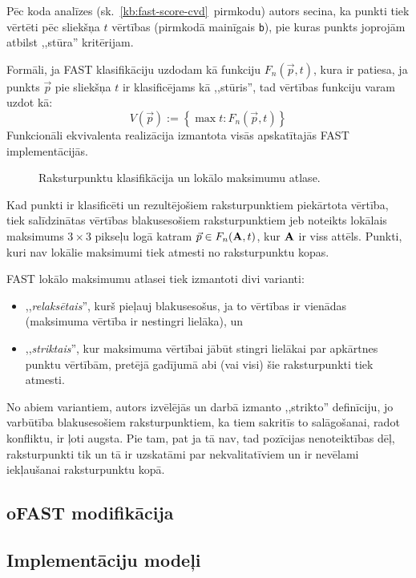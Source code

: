 Pēc koda analīzes (sk.~\ref{kb:fast-score-cvd}~pirmkodu)
autors secina, ka punkti tiek vērtēti pēc sliekšņa $t$ vērtības
(pirmkodā mainīgais \texttt{b}), pie kuras
punkts joprojām atbilst ,,stūra'' kritērijam.

Formāli, ja FAST klasifikāciju uzdodam kā funkciju $F_n(\vec{p}, t)$,
kura ir patiesa, ja punkts $\vec{p}$ pie sliekšņa $t$ ir klasificējams
kā ,,stūris'', tad vērtības funkciju varam uzdot kā:
\begin{equation}
	V(\vec{p}) := \left\{ \max{t} : F_n(\vec{p}, t) \right\}
\end{equation}
Funkcionāli ekvivalenta realizācija izmantota visās apskatītajās FAST
implementācijās.


\begin{figure}[tbh]
	\centering
	\def\svgwidth{0.8\linewidth}
	{}
	\caption{Raksturpunktu klasifikācija un lokālo maksimumu atlase.}
	\label{fig:nonmax}
\end{figure}

Kad punkti ir klasificēti un rezultējošiem raksturpunktiem piekārtota
vērtība, tiek salīdzinātas vērtības blakusesošiem raksturpunktiem
jeb
noteikts lokālais maksimums $3 \times 3$ pikseļu logā katram
$\vec{p} \in F_n(\mathbf{A}, t)$, kur $\mathbf{A}$ ir viss attēls.
Punkti, kuri nav lokālie maksimumi tiek atmesti no raksturpunktu kopas.

FAST lokālo maksimumu atlasei tiek izmantoti divi varianti:
\begin{itemize}
	\item ,,\emph{relaksētais}'', kurš pieļauj blakusesošus, ja to
		vērtības ir vienādas (maksimuma vērtība ir nestingri lielāka), un
	\item ,,\emph{striktais}'', kur maksimuma vērtībai jābūt stingri
		lielākai par apkārtnes punktu vērtībām, pretējā gadījumā abi (vai
		visi) šie raksturpunkti tiek atmesti.
\end{itemize}
No abiem variantiem, autors izvēlējās un darbā izmanto ,,strikto'' definīciju,
jo varbūtība blakusesošiem raksturpunktiem, ka tiem sakritīs to
 salāgošanai, radot konfliktu, ir ļoti augsta.
Pie tam, pat ja tā nav, tad pozīcijas nenoteiktības dēļ, raksturpunkti tik
un tā ir uzskatāmi par nekvalitatīviem un ir nevēlami iekļaušanai
raksturpunktu kopā.

\subsection{oFAST modifikācija} \label{sec:ofast}
\TODO

\subsection{Implementāciju modeļi} \label{sec:fast-impl}





